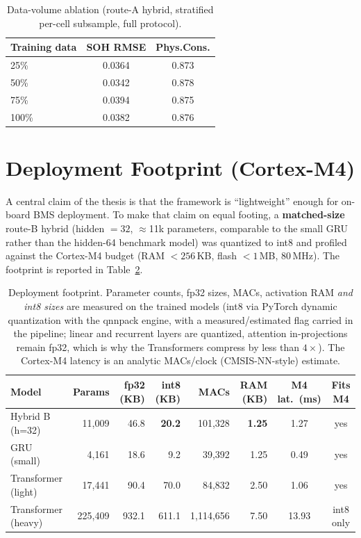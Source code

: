 \begin{table}[H]
\centering
\caption{Data-volume ablation (route-A hybrid, stratified per-cell subsample,
full protocol).}
\label{tab:datavolume}
\begin{tabular}{l c c}
\toprule
\textbf{Training data} & \textbf{SOH RMSE} & \textbf{Phys.Cons.} \\
\midrule
25\%  & 0.0364 & 0.873 \\
50\%  & 0.0342 & 0.878 \\
75\%  & 0.0394 & 0.875 \\
100\% & 0.0382 & 0.876 \\
\bottomrule
\end{tabular}
\end{table}

\section{Deployment Footprint (Cortex-M4)}
\label{sec:footprint}

A central claim of the thesis is that the framework is ``lightweight'' enough for
on-board BMS deployment. To make that claim on equal footing, a
\textbf{matched-size} route-B hybrid (hidden $=32$, $\approx$11k parameters,
comparable to the small GRU rather than the hidden-64 benchmark model) was
quantized to int8 and profiled against the Cortex-M4 budget (RAM $<256$\,KB,
flash $<1$\,MB, 80\,MHz). The footprint is reported in
Table~\ref{tab:footprint}.

\begin{table}[H]
\centering
\caption{Deployment footprint. Parameter counts, fp32 sizes, MACs, activation
RAM \emph{and int8 sizes} are measured on the trained models (int8 via PyTorch
dynamic quantization with the qnnpack engine, with a measured/estimated flag
carried in the pipeline; linear and recurrent layers are quantized, attention
in-projections remain fp32, which is why the Transformers compress by less than
$4\times$). The Cortex-M4 latency is an analytic MACs/clock (CMSIS-NN-style)
estimate.}
\label{tab:footprint}
\footnotesize %
\setlength{\tabcolsep}{2.5pt}
\begin{tabular}{l r r r r r c c}
\toprule
\textbf{Model} & \textbf{Params} & \textbf{fp32 (KB)} & \textbf{int8 (KB)} & \textbf{MACs} & \textbf{RAM (KB)} & \textbf{M4 lat.\ (ms)} & \textbf{Fits M4} \\
\midrule
Hybrid B (h=32) & 11{,}009 & 46.8 & \textbf{20.2} & 101{,}328 & \textbf{1.25} & 1.27 & yes \\
GRU (small)     &  4{,}161 & 18.6 & 9.2  & 39{,}392 & 1.25 & 0.49 & yes \\
Transformer (light) & 17{,}441 & 90.4 & 70.0 & 84{,}832 & 2.50 & 1.06 & yes \\
Transformer (heavy) & 225{,}409 & 932.1 & 611.1 & 1{,}114{,}656 & 7.50 & 13.93 & int8 only \\
\bottomrule
\end{tabular}
\end{table}

